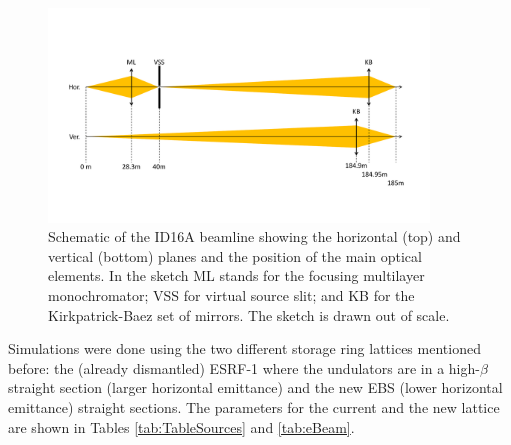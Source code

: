 \documentclass{iucr}              %
\begin{document}
\begin{figure}\label{fig:ID16A}
    \centering
    \includegraphics[width=0.9\textwidth,clip=true,trim=50 85 50 85]{GRAPHICS/ID16A.pdf}
    \caption{Schematic of the ID16A beamline showing the horizontal (top) and vertical (bottom) planes and the position of the main optical elements. In the sketch ML stands for the focusing multilayer monochromator; VSS for virtual source slit; and KB for the Kirkpatrick-Baez set of mirrors. The sketch is drawn out of scale.}
\end{figure}


\begin{table}\label{tab:Positions}
    \caption{Position of the main ID16A optical elements with respect to the source (undulator centre). It also shows the values for horizontal and vertical demagnification $M^{-1}=p/q$, where $p$ and $q$ are the the distances object-optics and optics-image, respectively.}
\end{table}


Simulations were done using the two different storage ring lattices mentioned before: the (already dismantled) ESRF-1 where the undulators are in a high-$\beta$ straight section (larger horizontal emittance) and the new EBS (lower horizontal emittance) straight sections. The parameters for the current and the new lattice are shown in Tables \ref{tab:TableSources} and \ref{tab:eBeam}.
\end{document}
